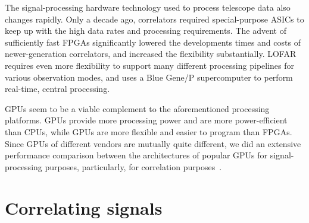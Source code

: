 \documentclass{article}
\begin{document}









The signal-processing hardware technology used to process telescope data
also changes rapidly.
Only a decade ago, correlators required special-purpose ASICs to keep up with
the high data rates and processing requirements.
The advent of sufficiently fast FPGAs significantly lowered the developments
times and costs of newer-generation correlators, and increased the flexibility
substantially.
LOFAR requires even more flexibility to support many different processing
pipelines for various observation modes, and uses a Blue Gene/P supercomputer
to perform real-time, central processing.

GPUs seem to be a viable complement to the aforementioned processing platforms.
GPUs provide more processing power and are more power-efficient than CPUs,
while GPUs are more flexible and easier to program than FPGAs.
Since GPUs of different vendors are mutually quite different, we did an
extensive performance comparison between the architectures of popular GPUs 
for signal-processing purposes, particularly, for correlation
purposes~\cite{Nieuwpoort:09}.




\section{Correlating signals}



\end{document}
